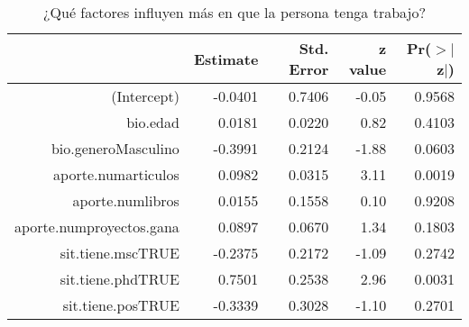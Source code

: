 \begin{table}[ht]
\centering
\begin{tabular}{rrrrr}
  \hline
 & Estimate & Std. Error & z value & Pr($>$$|$z$|$) \\ 
  \hline
(Intercept) & -0.0401 & 0.7406 & -0.05 & 0.9568 \\ 
  bio.edad & 0.0181 & 0.0220 & 0.82 & 0.4103 \\ 
  bio.generoMasculino & -0.3991 & 0.2124 & -1.88 & 0.0603 \\ 
  aporte.numarticulos & 0.0982 & 0.0315 & 3.11 & 0.0019 \\ 
  aporte.numlibros & 0.0155 & 0.1558 & 0.10 & 0.9208 \\ 
  aporte.numproyectos.gana & 0.0897 & 0.0670 & 1.34 & 0.1803 \\ 
  sit.tiene.mscTRUE & -0.2375 & 0.2172 & -1.09 & 0.2742 \\ 
  sit.tiene.phdTRUE & 0.7501 & 0.2538 & 2.96 & 0.0031 \\ 
  sit.tiene.posTRUE & -0.3339 & 0.3028 & -1.10 & 0.2701 \\ 
   \hline
\end{tabular}
\caption{¿Qué factores influyen más en que la persona tenga trabajo?} 
\label{tab:reg1}
\end{table}
